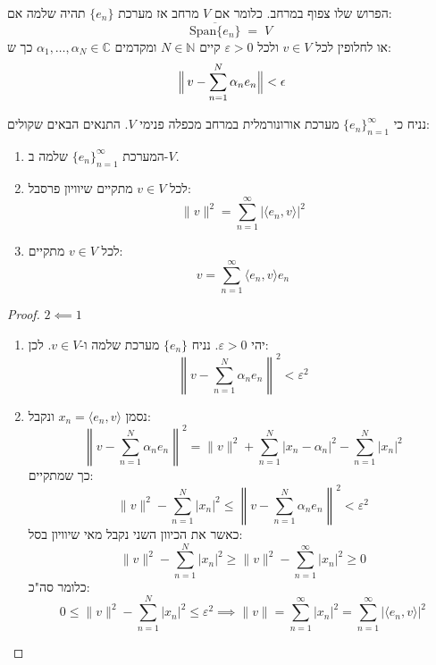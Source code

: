 \documentclass{tstextbook}
\begin{document}
\begin{definition}
הפרוש שלו צפוף במרחב. כלומר אם \(V\) מרחב אז מערכת \(\{ e_{n} \}\) תהיה שלמה אם:
$$\overline{{{\mathrm{Span}\{e_{n}\}}}}\;=\;V\;$$
או לחלופין לכל \(v \in V\) ולכל \(\varepsilon>0\) קיים \(N \in \mathbb{N}\) ומקדמים \(\alpha_{1},\dots,\alpha_{N}\in \mathbb{C}\) כך ש:
$$\Bigl\|\,v-\sum_{n=1}^{N}\alpha_{n}e_{n}\Bigr\|<\epsilon$$

\end{definition}
\begin{proposition}
נניח כי \(\{ e_{n} \}_{n=1}^{\infty}\) מערכת אורונורמלית במרחב מכפלה פנימי \(V\). התנאים הבאים שקולים:

  \begin{enumerate}
    \item המערכת \(\{ e_{n} \}_{n=1}^{\infty}\) שלמה ב-\(V\). 


    \item לכל \(v \in V\) מתקיים שיוויון פרסבל: 
$$\lVert v \rVert ^{2}=\sum_{n=1}^{\infty}\lvert \langle e_{n},v \rangle  \rvert ^{2}$$


    \item לכל \(v \in V\) מתקיים: 
$$v=\sum_{n=1}^{\infty} \langle e_{n},v \rangle e_{n}$$


  \end{enumerate}
\end{proposition}
\begin{proof}
\(2\impliedby 1\)

  \begin{enumerate}
    \item יהי \(\varepsilon> 0\). נניח \(\{ e_{n} \}\) מערכת שלמה ו-\(v \in V\). לכן: 
$$\left\|v-\sum_{n=1}^{N}\alpha_{n}e_{n}\right\|^{2}<\varepsilon^{2}$$


    \item נסמן \(x_{n}=\langle e_{n},v \rangle\) ונקבל: 
$$\left\|v-\sum_{n=1}^{N}\alpha_{n}e_{n}\right\|^{2}=\|v\|^{2}+\sum_{n=1}^{N}|x_{n}-\alpha_{n}|^{2}-\sum_{n=1}^{N}|x_{n}|^{2}$$
כך שמתקיים:
$$\|v\|^{2}-\sum_{n=1}^{N}\left|x_{n}\right|^{2}\leq\left\|v-\sum_{n=1}^{N}\alpha_{n}e_{n}\right\|^{2}<\varepsilon^{2}$$
כאשר את הכיוון השני נקבל מאי שיוויון בסל:
$$\lVert v \rVert^{2}-\sum_{n=1}^{N}\left|x_{n}\right|^{2}\geq\lVert v \rVert^{2}-\sum_{n=1}^{\infty}\left|x_{n}\right|^{2}\geq0$$
כלומר סה"כ:
$$0\leq\|v\|^{2}-\sum_{n=1}^{N}\left|x_{n}\right|^{2}\leq\varepsilon^{2}\implies \lVert v \rVert =\sum_{n=1}^{\infty}\left|x_{n}\right|^{2}=\sum_{n=1}^{\infty}\left|\langle e_{n},v\rangle\right|^{2}$$


  \end{enumerate}
\end{proof}
\end{document}
